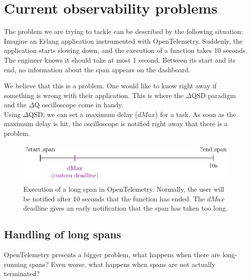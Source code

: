 \section{Current observability problems}
    The problem we are trying to tackle can be described by the following situation: 
    Imagine an Erlang application instrumented with OpenTelemetry. Suddenly, the application starts slowing down, and the execution of a function takes 10 seconds. The engineer knows it should take at most 1 second. Between its start and its end, no information about the span appears on the dashboard.
    
    We believe that this is a problem. One would like to know right away if something is wrong with their application. This is where the $\Delta$QSD paradigm and the $\Delta$Q oscilloscope come in handy. \\ 
   Using $\Delta$QSD, we can set a maximum delay ($dMax$) for a task. As soon as the maximum delay is hit, the oscilloscope is notified right away that there is a problem.
   
   \begin{figure}[H]
        \begin{center}
            \includegraphics{tikz/start_end_dmax.pdf}
        \end{center}
        \caption{Execution of a long span in OpenTelemetry. Normally, the user will be notified after 10 seconds that the function has ended. The $dMax$ deadline gives an early notification that the span has taken too long.}
        \label{fig:otel_dmax}
    \end{figure} 


    \subsection{Handling of long spans}
        OpenTelemetry presents a bigger problem, what happens when there are long-running spans? Even worse, what happens when spans are not actually terminated?
        
